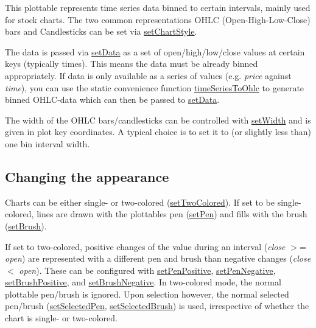 This plottable represents time series data binned to certain intervals, mainly used for stock charts. The two common representations O\+H\+LC (Open-\/\+High-\/\+Low-\/\+Close) bars and Candlesticks can be set via \hyperlink{classQCPFinancial_a5a59175d36279d71596e64d7bb65596f}{set\+Chart\+Style}.

The data is passed via \hyperlink{classQCPFinancial_adf12a86082f1e488df6a4e8603f8fd6d}{set\+Data} as a set of open/high/low/close values at certain keys (typically times). This means the data must be already binned appropriately. If data is only available as a series of values (e.\+g. {\itshape price} against {\itshape time}), you can use the static convenience function \hyperlink{classQCPFinancial_a0c3453d1c03e320950fdd2df54e3ebc8}{time\+Series\+To\+Ohlc} to generate binned O\+H\+L\+C-\/data which can then be passed to \hyperlink{classQCPFinancial_adf12a86082f1e488df6a4e8603f8fd6d}{set\+Data}.

The width of the O\+H\+LC bars/candlesticks can be controlled with \hyperlink{classQCPFinancial_a99633f8bac86a61d534ae5eeb1a3068f}{set\+Width} and is given in plot key coordinates. A typical choice is to set it to (or slightly less than) one bin interval width.\hypertarget{classQCPStatisticalBox_appearance}{}\subsection{Changing the appearance}\label{classQCPStatisticalBox_appearance}
Charts can be either single-\/ or two-\/colored (\hyperlink{classQCPFinancial_a138e44aac160a17a9676652e240c5f08}{set\+Two\+Colored}). If set to be single-\/colored, lines are drawn with the plottable\textquotesingle{}s pen (\hyperlink{classQCPAbstractPlottable_ab74b09ae4c0e7e13142fe4b5bf46cac7}{set\+Pen}) and fills with the brush (\hyperlink{classQCPAbstractPlottable_a7a4b92144dca6453a1f0f210e27edc74}{set\+Brush}).

If set to two-\/colored, positive changes of the value during an interval ({\itshape close} $>$= {\itshape open}) are represented with a different pen and brush than negative changes ({\itshape close} $<$ {\itshape open}). These can be configured with \hyperlink{classQCPFinancial_ac58aa3adc7a35aab0088764b840683e5}{set\+Pen\+Positive}, \hyperlink{classQCPFinancial_afe5c07e94ccea01a75b3a2476993c346}{set\+Pen\+Negative}, \hyperlink{classQCPFinancial_a5ebff2b1764efd07cc44942e67821829}{set\+Brush\+Positive}, and \hyperlink{classQCPFinancial_a8bbdd87629f9144b3ef51af660c0961a}{set\+Brush\+Negative}. In two-\/colored mode, the normal plottable pen/brush is ignored. Upon selection however, the normal selected pen/brush (\hyperlink{classQCPAbstractPlottable_a6911603cad23ab0469b108224517516f}{set\+Selected\+Pen}, \hyperlink{classQCPAbstractPlottable_ae8c816874089f7a44001e8618e81a9dc}{set\+Selected\+Brush}) is used, irrespective of whether the chart is single-\/ or two-\/colored. 

